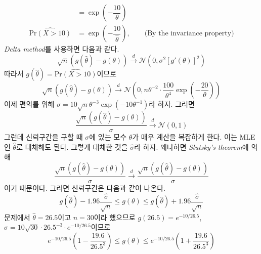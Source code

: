 \documentclass[answers]{exam}
\begin{document}
\begin{questions}
\begin{solution}
\begin{enumerate}[(a)]
\begin{align}
        &= \exp\left(-\dfrac{10}{\theta}\right)\\
        \widehat{\mathrm{Pr}\left(X>10\right)} &= \exp\left(-\dfrac{10}{\widehat{\theta}}\right),\qquad \text{(By the invariance property)}
      \end{align}
      \emph{Delta method}를 사용하면 다음과 같다.
      \begin{equation}
        \sqrt{n}\left(g\left(\widehat{\theta}\right)-g\left(\theta\right)\right)\xrightarrow{d}\mathcal{N}\left(0,\sigma^{2}\left[g'\left(\theta\right)\right]^{2}\right)
      \end{equation}
      따라서 $g\left(\widehat{\theta}\right)=\widehat{\mathrm{Pr}\left(X>10\right)}$이므로
      \begin{equation}
        \sqrt{n}\left(g\left(\widehat{\theta}\right)-g\left(\theta\right)\right)\xrightarrow{d}\mathcal{N}\left(0,n\theta^{-2}\cdot\dfrac{100}{\theta^{4}}\exp\left(-\dfrac{20}{\theta}\right)\right)
      \end{equation}
      이제 편의를 위해 $\sigma=10\sqrt{n}\theta^{-3}\exp\left(-10\theta^{-1}\right)$라 하자. 그러면
      \begin{equation}
        \dfrac{\sqrt{n}\left(g\left(\widehat{\theta}\right)-g\left(\theta\right)\right)}{\sigma}\xrightarrow{d}\mathcal{N}\left(0,1\right)
      \end{equation}
      그런데 신뢰구간을 구할 때 $\sigma$에 있는 모수 $\theta$가 매우 계산을 복잡하게 한다. 이는 MLE인 $\widehat{\theta}$로 대체해도 된다. 그렇게 대체한 것을 $\widehat{\sigma}$라 하자. 왜냐하면 \emph{Slutsky's theorem}에 의해
      \begin{equation}
        \dfrac{\sqrt{n}\left(g\left(\widehat{\theta}\right)-g\left(\theta\right)\right)}{\widehat{\sigma}} \xrightarrow{d} \dfrac{\sqrt{n}\left(g\left(\widehat{\theta}\right)-g\left(\theta\right)\right)}{\sigma}
      \end{equation}
      이기 때문이다. 그러면 신뢰구간은 다음과 같이 나온다.
      \begin{equation}
        g\left(\widehat{\theta}\right)-1.96\dfrac{\widehat{\sigma}}{\sqrt{n}}\leq g\left(\theta\right)\leq g\left(\widehat{\theta}\right)+1.96\dfrac{\widehat{\sigma}}{\sqrt{n}}
      \end{equation}
      문제에서 $\widehat{\theta}=26.5$이고 $n=30$이라 했으므로 $g\left(26.5\right)= e^{-10/26.5}$, $\widehat{\sigma}=10\sqrt{30}\cdot 26.5^{-3}\cdot e^{-10/26.5}$이므로
      \begin{equation}
        e^{-10/26.5}\left(1-\dfrac{19.6}{26.5^{3}}\right)\leq g\left(\theta\right)\leq e^{-10/26.5}\left(1+\dfrac{19.6}{26.5^{3}}\right)

\end{equation}
\end{enumerate}
\end{solution}
\end{questions}
\end{document}
